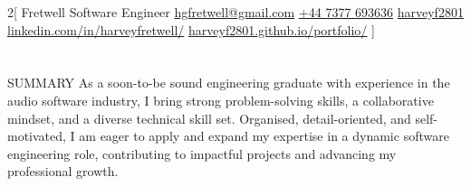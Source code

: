 \documentclass{my_cv}
\begin{document}
\begin{multicols}{2}[
        {Fretwell}%
        {Software Engineer}%
        {\href{mailto:hgfretwell@gmail.com}{hgfretwell@gmail.com}}%
        {\href{tel:447377693636}{+44 7377 693636}}%
        {\href{https://github.com/harveyf2801}{harveyf2801}}%
        {\href{https://www.linkedin.com/in/harveyfretwell/}{linkedin.com/in/harveyfretwell/}}%
        {\href{https://harveyf2801.github.io/portfolio/}{harveyf2801.github.io/portfolio/}}%
]
\end{multicols}

\section{\faFileText}{SUMMARY}
As a soon-to-be sound engineering graduate with experience in the audio software industry, I bring strong problem-solving skills, a collaborative mindset, and a diverse technical skill set. Organised, detail-oriented, and self-motivated, I am eager to apply and expand my expertise in a dynamic software engineering role, contributing to impactful projects and advancing my professional growth.
\end{document}
